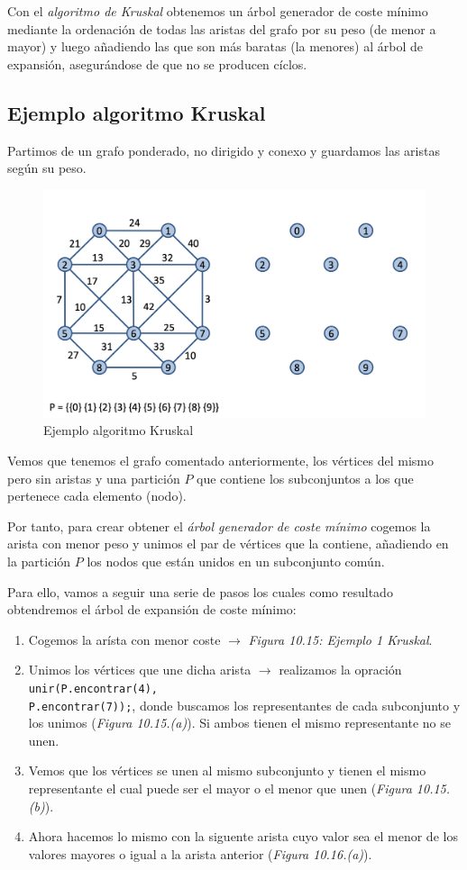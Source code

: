 Con el \textit{algoritmo de Kruskal} obtenemos un árbol generador de coste mínimo mediante la ordenación de todas las aristas del grafo por su peso (de menor a mayor) y luego añadiendo las que son más baratas (la menores) al árbol de expansión, asegurándose de que no se producen cíclos.

\subsection{Ejemplo algoritmo Kruskal}
Partimos de un grafo ponderado, no dirigido y conexo y guardamos las aristas según su peso.
\begin{figure}[h]
  \begin{center}
    \includegraphics[width=.7\textwidth]{assets/kru1.png}
  \end{center}
  \caption{Ejemplo algoritmo Kruskal}
\end{figure}

Vemos que tenemos el grafo comentado anteriormente, los vértices del mismo pero sin aristas y una partición \(P\) que contiene los subconjuntos a los que pertenece cada elemento (nodo).

Por tanto, para crear obtener el \textit{árbol generador de coste mínimo} cogemos la arista con menor peso y unimos el par de vértices que la contiene, añadiendo en la partición \(P\) los nodos que están unidos en un subconjunto común.

Para ello, vamos a seguir una serie de pasos los cuales como resultado obtendremos el árbol de expansión de coste mínimo:
\begin{enumerate}
  \item Cogemos la arísta con menor coste \(\rightarrow\) \textit{Figura 10.15: Ejemplo 1 Kruskal}.
  \item Unimos los vértices que une dicha arista \(\rightarrow\) realizamos la opración \texttt{unir(P.encontrar(4),\\P.encontrar(7));}, donde buscamos los representantes de cada subconjunto y los unimos (\textit{Figura 10.15.(a)}).
  Si ambos tienen el mismo representante no se unen.
  \item Vemos que los vértices se unen al mismo subconjunto y tienen el mismo representante el cual puede ser el mayor o el menor que unen (\textit{Figura 10.15.(b)}).
  \item Ahora hacemos lo mismo con la siguente arista cuyo valor sea el menor de los valores mayores o igual a la arista anterior (\textit{Figura 10.16.(a)}). 
\end{enumerate}

